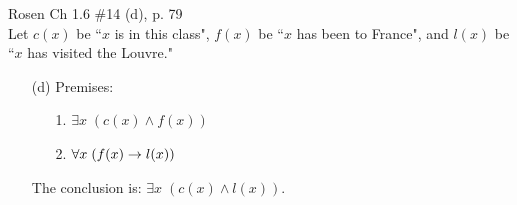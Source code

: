 \begin{questions}
 Rosen Ch 1.6 \#14 (d), p. 79 \\
Let $c(x)$ be ``$x$ is in this class", $f(x)$ be ``$x$ has been to France", and $l(x)$ be ``$x$ has visited the Louvre."
   \ifprintanswers
        \vspace{-10pt}
    \fi
\begin{solution}
    \begin{itemize}[itemsep=0pt,parsep=0pt,topsep=0pt,partopsep=0pt]
%
%
        \item[(d)] %
        Premises: 
        \begin{itemize}[itemsep=0pt,parsep=0pt,topsep=0pt,partopsep=0pt]
            \item[1.] $\exists x\; (c(x) \wedge f(x))$
            \item[2.] $\forall x\; (f(x) \rightarrow l(x))$
        \end{itemize}
        The conclusion is: $\exists x\; (c(x) \wedge l(x))$.


\end{itemize}
\end{solution}
\end{questions}
